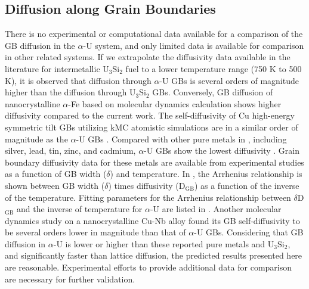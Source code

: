\documentclass[review]{elsarticle}
\begin{document}
\subsection{Diffusion along Grain Boundaries}

\par There is no experimental or computational data available for a comparison of the GB diffusion in the $\alpha$-U system, and only limited data is available for comparison in other related systems. If we extrapolate the diffusivity data available in the literature for intermetallic U$_\mathrm{3}$Si$_\mathrm{2}$ fuel to a lower temperature range (750 K to 500 K), it is observed that diffusion through $\alpha$-U GBs is several orders of magnitude higher than the diffusion through U$_\mathrm{3}$Si$_\mathrm{2}$ GBs. Conversely, GB diffusion of nanocrystalline $\alpha$-Fe based on molecular dynamics calculation shows higher diffusivity \cite{MOHAMMADZADEH201756} compared to the current work. The self-diffusivity of Cu high-energy symmetric tilt GBs utilizing kMC atomistic simulations are in a similar order of magnitude as the $\alpha$-U GBs \cite{Suzuki2003}. Compared with other pure metals in , including silver, lead, tin, zinc, and cadmium, $\alpha$-U GBs show the lowest diffusivity \cite{diffusion_compare}. Grain boundary diffusivity data for these metals are available from experimental studies as a function of GB width ($\delta$) and temperature. In , the Arrhenius relationship is shown between GB width ($\delta$) times diffusivity (D$_\mathrm{GB}$) as a function of the inverse of the temperature. Fitting parameters for the Arrhenius relationship between $\delta$D$_\mathrm{GB}$ and the inverse of temperature for $\alpha$-U are listed in . Another molecular dynamics study on a nanocrystalline Cu-Nb alloy found its GB self-diffusivity to be several orders lower in magnitude \cite{cu_nb} than that of $\alpha$-U GBs. Considering that GB diffusion in $\alpha$-U is lower or higher than these reported pure metals and U$_3$Si$_2$, and significantly faster than lattice diffusion, the predicted results presented here are reasonable. Experimental efforts to provide additional data for comparison are necessary for further validation. 
\end{document}
